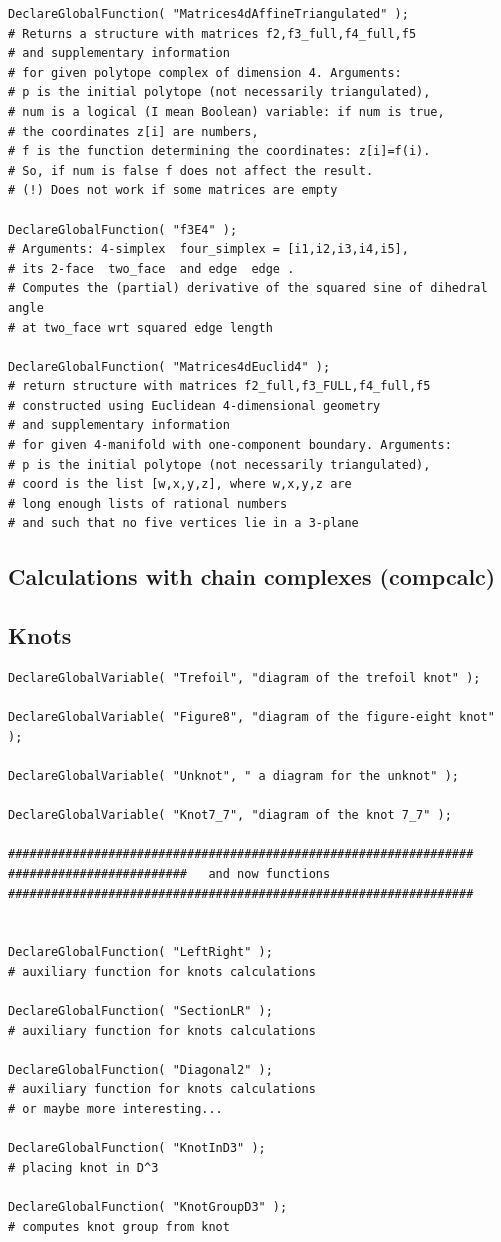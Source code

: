 \documentclass{article}
\begin{document}
\begin{verbatim}
DeclareGlobalFunction( "Matrices4dAffineTriangulated" );
# Returns a structure with matrices f2,f3_full,f4_full,f5 
# and supplementary information
# for given polytope complex of dimension 4. Arguments:
# p is the initial polytope (not necessarily triangulated),
# num is a logical (I mean Boolean) variable: if num is true, 
# the coordinates z[i] are numbers,
# f is the function determining the coordinates: z[i]=f(i). 
# So, if num is false f does not affect the result.
# (!) Does not work if some matrices are empty

DeclareGlobalFunction( "f3E4" );
# Arguments: 4-simplex  four_simplex = [i1,i2,i3,i4,i5], 
# its 2-face  two_face  and edge  edge .
# Computes the (partial) derivative of the squared sine of dihedral angle 
# at two_face wrt squared edge length

DeclareGlobalFunction( "Matrices4dEuclid4" );
# return structure with matrices f2_full,f3_FULL,f4_full,f5
# constructed using Euclidean 4-dimensional geometry
# and supplementary information
# for given 4-manifold with one-component boundary. Arguments:
# p is the initial polytope (not necessarily triangulated),
# coord is the list [w,x,y,z], where w,x,y,z are 
# long enough lists of rational numbers
# and such that no five vertices lie in a 3-plane
\end{verbatim}

\subsection{Calculations with chain complexes (compcalc)}


\subsection{Knots}

\begin{verbatim}
DeclareGlobalVariable( "Trefoil", "diagram of the trefoil knot" );

DeclareGlobalVariable( "Figure8", "diagram of the figure-eight knot" );

DeclareGlobalVariable( "Unknot", " a diagram for the unknot" );

DeclareGlobalVariable( "Knot7_7", "diagram of the knot 7_7" );

#################################################################
#########################   and now functions
#################################################################


DeclareGlobalFunction( "LeftRight" );
# auxiliary function for knots calculations

DeclareGlobalFunction( "SectionLR" );
# auxiliary function for knots calculations

DeclareGlobalFunction( "Diagonal2" );
# auxiliary function for knots calculations
# or maybe more interesting...

DeclareGlobalFunction( "KnotInD3" );
# placing knot in D^3

DeclareGlobalFunction( "KnotGroupD3" );
# computes knot group from knot
\end{verbatim}
\end{document}
